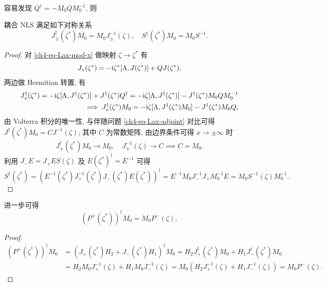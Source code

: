 容易发现 $ Q^{\dagger} = - M_{0} Q M_{0}^{-1}$, 则
\begin{proposition}
    耦合 NLS 满足如下对称关系
    \begin{equation}
        J_{\pm}^{\dagger}(\zeta^{*}) M_{0} = M_{0} J_{\pm}^{-1}(\zeta), \quad S^{\dagger}(\zeta^{*}) M_{0} = M_{0} S^{-1} . \label{ch4-eq-J-symmetry}
    \end{equation}
\end{proposition}
\begin{proof}
    对 \eqref{ch4-eq-Lax-mod-x} 做映射 $ \zeta \to \zeta^{*} $ 有
    \begin{equation}
        J_{x}(\zeta^{*}) = - \mathrm{i} \zeta^{*} [\Lambda, J(\zeta^{*})] + Q J(\zeta^{*}),
    \end{equation}
    两边做 Hermitian 转置, 有
    \begin{equation}
        \begin{aligned}
            J_{x}^{\dagger}(\zeta^{*}) = -\mathrm{i} \zeta [\Lambda, J^{\dagger}(\zeta^{*})] + J^{\dagger}(\zeta^{*}) Q^{\dagger} =  -\mathrm{i} \zeta [\Lambda, J^{\dagger}(\zeta^{*})] - J^{\dagger}(\zeta^{*}) M_{0} Q M_{0}^{-1} \\
            \implies J_{x}^{\dagger}(\zeta^{*}) M_{0} = -\mathrm{i} \zeta [\Lambda, J^{\dagger}(\zeta^{*}) M_{0}] - J^{\dagger}(\zeta^{*}) M_{0} Q,
        \end{aligned}
    \end{equation}
    由 Volterra 积分的唯一性, 与伴随问题 \eqref{ch4-eq-Lax-adjoint} 对比可得 $J^{\dagger}(\zeta^{*}) M_{0} = C J^{-1}(\zeta)$, 其中 $C$ 为常数矩阵, 由边界条件可得 $x \to \pm \infty$ 时
    \begin{equation}
        J_{\pm}^{\dagger}(\zeta^{*}) M_{0} \to M_{0}, \quad J_{\pm}^{-1}(\zeta) \to C \implies C = M_{0}.
    \end{equation}
    利用 $J_{-} E = J_{+} E S(\zeta)$ 及 $E(\zeta^{*})^{\dagger} = E^{-1}$ 可得
    \begin{equation}
        S^{\dagger}(\zeta^{*}) = \left( E^{-1}(\zeta^{*}) J_{+}^{-1}(\zeta^{*}) J_{-}(\zeta^{*}) E(\zeta^{*}) \right)^{\dagger} = E^{-1} M_{0} J_{-}^{-1} J_{+} M_{0}^{-1} E = M_{0} S^{-1}(\zeta) M_{0}^{-1}.
    \end{equation}
\end{proof}
进一步可得
\begin{equation}
    \left(P^{+}(\zeta^{*}) \right)^{\dagger} M_{0} = M_{0} P^{-}(\zeta),
\end{equation}
\begin{proof}
    \begin{equation}
        \begin{aligned}
            (P^{+}(\zeta^{*}))^{\dagger} M_{0} & = \left(J_{+}(\zeta^{*}) H_{2} + J_{-}(\zeta^{*}) H_{1} \right)^{\dagger} M_{0} = H_{2} J_{+}^{\dagger}(\zeta^{*}) M_{0} + H_{1} J_{-}^{\dagger}(\zeta^{*}) M_{0} \\
                                               & = H_{2} M_{0} J_{+}^{-1}(\zeta) + H_{1} M_{0} J_{-}^{-1}(\zeta) = M_{0} \left(H_{2} J_{+}^{-1}(\zeta) + H_{1} J_{-}^{-1}(\zeta) \right) = M_{0} P^{-}(\zeta).
        \end{aligned}
    \end{equation}
\end{proof}
